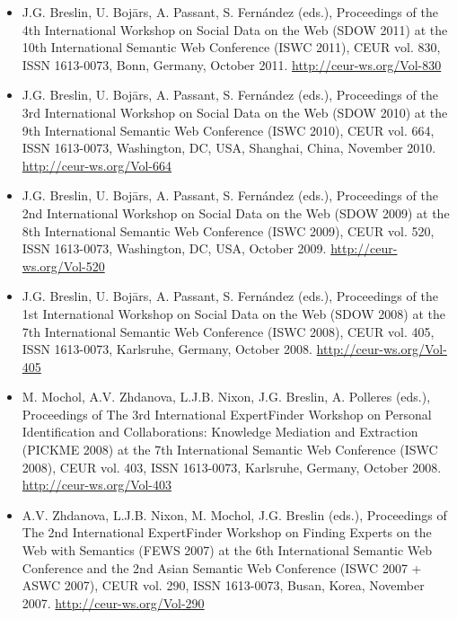 \documentclass[10pt,a4paper]{res} %
\begin{document}
\begin{resume}
\begin{itemize}
\item J.G. Breslin, U. Boj\={a}rs, A. Passant, S. Fern\'{a}ndez (eds.), Proceedings of the 4th International Workshop on Social Data on the Web (SDOW 2011) at the 10th International Semantic Web Conference (ISWC 2011), CEUR vol. 830, ISSN 1613-0073, Bonn, Germany, October 2011. \url{http://ceur-ws.org/Vol-830}
\item J.G. Breslin, U. Boj\={a}rs, A. Passant, S. Fern\'{a}ndez (eds.), Proceedings of the 3rd International Workshop on Social Data on the Web (SDOW 2010) at the 9th International Semantic Web Conference (ISWC 2010), CEUR vol. 664, ISSN 1613-0073, Washington, DC, USA, Shanghai, China, November 2010. \url{http://ceur-ws.org/Vol-664}
\item J.G. Breslin, U. Boj\={a}rs, A. Passant, S. Fern\'{a}ndez (eds.), Proceedings of the 2nd International Workshop on Social Data on the Web (SDOW 2009) at the 8th International Semantic Web Conference (ISWC 2009), CEUR vol. 520, ISSN 1613-0073, Washington, DC, USA, October 2009. \url{http://ceur-ws.org/Vol-520}
\item J.G. Breslin, U. Boj\={a}rs, A. Passant, S. Fern\'{a}ndez (eds.), Proceedings of the 1st International Workshop on Social Data on the Web (SDOW 2008) at the 7th International Semantic Web Conference (ISWC 2008), CEUR vol. 405, ISSN 1613-0073, Karlsruhe, Germany, October 2008. \url{http://ceur-ws.org/Vol-405}
\item M. Mochol, A.V. Zhdanova, L.J.B. Nixon, J.G. Breslin, A. Polleres (eds.), Proceedings of The 3rd International ExpertFinder Workshop on Personal Identification and Collaborations: Knowledge Mediation and Extraction (PICKME 2008) at the 7th International Semantic Web Conference (ISWC 2008), CEUR vol. 403, ISSN 1613-0073, Karlsruhe, Germany, October 2008. \url{http://ceur-ws.org/Vol-403}
\item A.V. Zhdanova, L.J.B. Nixon, M. Mochol, J.G. Breslin (eds.), Proceedings of The 2nd International ExpertFinder Workshop on Finding Experts on the Web with Semantics (FEWS 2007) at the 6th International Semantic Web Conference and the 2nd Asian Semantic Web Conference (ISWC 2007 + ASWC 2007), CEUR vol. 290, ISSN 1613-0073, Busan, Korea, November 2007. \url{http://ceur-ws.org/Vol-290}
\end{itemize}



\vspace{0.2in} %


\end{resume}
\end{document}
